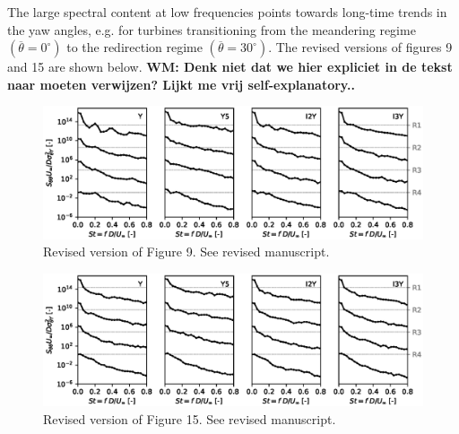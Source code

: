 \documentclass[]{article}
\newcommand{\red}[1]{\textbf{\color{red} #1}}
\begin{document}
The large spectral content at low frequencies points towards long-time trends in the yaw angles, e.g. for turbines transitioning from the meandering regime $(\overline{\theta} = 0^{\circ})$ to the redirection regime $(\overline{\theta} = 30^{\circ})$. The revised versions of figures 9 and 15 are shown below. \red{WM: Denk niet dat we hier expliciet in de tekst naar moeten verwijzen? Lijkt me vrij self-explanatory..}

\begin{figure}
	\includegraphics[width=\textwidth]{figure9_revised}
	\caption{Revised version of Figure 9. See revised manuscript.}
\end{figure}

\begin{figure}
	\includegraphics[width=\textwidth]{figure15_revised}
	\caption{Revised version of Figure 15. See revised manuscript.}
\end{figure}
\end{document}
